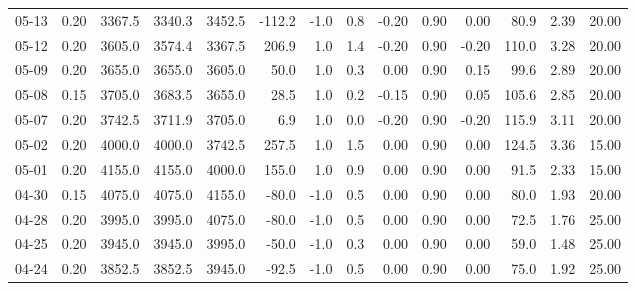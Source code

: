 \begin{threeparttable}
{\begin{tabular}{lrrrrrrrrrrrrr}
  05-13 &     0.20 & 3367.5 & 3340.3 & 3452.5 &     -112.2 &                     -1.0 &                 0.8 &      -0.20 &      0.90 &           0.00 &             80.9 &            2.39 &                  20.00 \\
  05-12 &     0.20 & 3605.0 & 3574.4 & 3367.5 &      206.9 &                      1.0 &                 1.4 &      -0.20 &      0.90 &          -0.20 &            110.0 &            3.28 &                  20.00 \\
  05-09 &     0.20 & 3655.0 & 3655.0 & 3605.0 &       50.0 &                      1.0 &                 0.3 &       0.00 &      0.90 &           0.15 &             99.6 &            2.89 &                  20.00 \\
  05-08 &     0.15 & 3705.0 & 3683.5 & 3655.0 &       28.5 &                      1.0 &                 0.2 &      -0.15 &      0.90 &           0.05 &            105.6 &            2.85 &                  20.00 \\
  05-07 &     0.20 & 3742.5 & 3711.9 & 3705.0 &        6.9 &                      1.0 &                 0.0 &      -0.20 &      0.90 &          -0.20 &            115.9 &            3.11 &                  20.00 \\
  05-02 &     0.20 & 4000.0 & 4000.0 & 3742.5 &      257.5 &                      1.0 &                 1.5 &       0.00 &      0.90 &           0.00 &            124.5 &            3.36 &                  15.00 \\
  05-01 &     0.20 & 4155.0 & 4155.0 & 4000.0 &      155.0 &                      1.0 &                 0.9 &       0.00 &      0.90 &           0.00 &             91.5 &            2.33 &                  15.00 \\
  04-30 &     0.15 & 4075.0 & 4075.0 & 4155.0 &      -80.0 &                     -1.0 &                 0.5 &       0.00 &      0.90 &           0.00 &             80.0 &            1.93 &                  20.00 \\
  04-28 &     0.20 & 3995.0 & 3995.0 & 4075.0 &      -80.0 &                     -1.0 &                 0.5 &       0.00 &      0.90 &           0.00 &             72.5 &            1.76 &                  25.00 \\
  04-25 &     0.20 & 3945.0 & 3945.0 & 3995.0 &      -50.0 &                     -1.0 &                 0.3 &       0.00 &      0.90 &           0.00 &             59.0 &            1.48 &                  25.00 \\
  04-24 &     0.20 & 3852.5 & 3852.5 & 3945.0 &      -92.5 &                     -1.0 &                 0.5 &       0.00 &      0.90 &           0.00 &             75.0 &            1.92 &                  25.00 \\

\end{tabular}}
\end{threeparttable}
